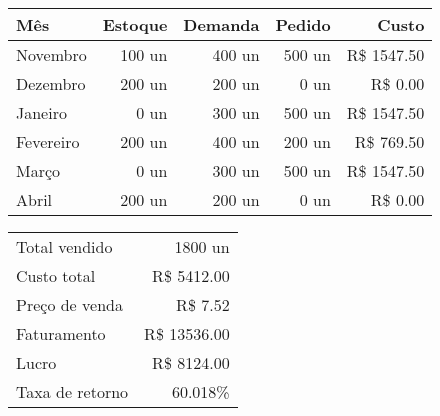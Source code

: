 
	\begin{table}[ht]
		\centering
		\begin{tabular}{lrrrr}
			\toprule
			Mês       & Estoque & Demanda & Pedido &       Custo \\
			\midrule
			Novembro  &  100 un &  400 un & 500 un & R\$ 1547.50 \\
			Dezembro  &  200 un &  200 un &   0 un & R\$    0.00 \\
			Janeiro   &    0 un &  300 un & 500 un & R\$ 1547.50 \\
			Fevereiro &  200 un &  400 un & 200 un & R\$  769.50 \\
			Março     &    0 un &  300 un & 500 un & R\$ 1547.50 \\
			Abril     &  200 un &  200 un &   0 un & R\$    0.00 \\
			\bottomrule
		\end{tabular}
	\end{table}

	\begin{table}[ht]
		\centering
		\begin{tabular}{lr}
			\toprule
			Total vendido   &      1800 un    \\
			Custo total     & R\$  5412.00    \\
			Preço de venda  & R\$     7.52    \\
			Faturamento     & R\$ 13536.00    \\
			Lucro           & R\$  8124.00    \\
			Taxa de retorno &        60.018\% \\
			\bottomrule
		\end{tabular}
	\end{table}


